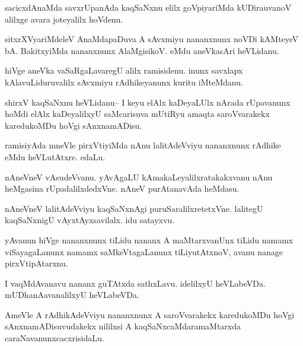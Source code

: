 \documentclass{article}
\begin{document}
\begin{mn}%
sacicxdAnaMda savxrUpanAda kaqSaNxnu elilx goVpiyariMda kUDirauvanoV alilxge avara 
joteyalilx hoVdenu.
\end{mn}

\begin{mn}%
sitxrXVyariMdeleV AnaMdapaDuva A sAvxmiyu nananxnunx noVDi kAMteyeV bA. BakitxyiMda 
nananxnunx AlaMgisikoV. eMdu aneVkasAri heVLidanu.
\end{mn}

\begin{mn}%
hiVge aneVka vaSaRgaLavaregU alilx ramisidenu. inunx savxlapx kAlavuLiduruvalilx sAvxmiyu 
rAdhikeyanunx kuritu iMteMdanu.
\end{mn}

\begin{mn}%
shirxV kaqSaNxnu heVLidanu-- I keyu elAlx kaDeyaLUlx nArada rUpavanunx hoMdi elAlx 
kaDeyalilxyU saMcarisuva mUtiRyu amaqta saroVvarakekx karedukoMDu hoVgi sAnxnamADisu.
\end{mn}

\begin{mn}%
ramisiyAda mneVle pirxVtiyiMda nAnu lalitAdeVviyu nananxnunx rAdhike eMdu heVLutAtxre. edaLu.
\end{mn}

\begin{mn}%
nAneVneV vAsudeVvanu. yAvAgaLU kAmakaLeyalilxratakakxvanu nAnu heMgasina 
rUpadalilxdedxVne. nAneV purAtanavAda heMdasu.
\end{mn}

\begin{mn}%
nAneVneV lalitAdeVviyu kaqSaNxnAgi puruSaralilxretetxVne. lalitegU kaqSaNxnigU 
vAyxtAyxsavilalx. idu satayxvu.
\end{mn}

\begin{mn}%
yAvanun hiVge nananxnunx tiLidu nananx A maMtarxvanUnx tiLidu namamx viSayagaLanunx namamx 
saMkeVtagaLanunx tiLiyutAtxnoV, avanu nanage pirxVtipAtarxnu.
\end{mn}

\begin{mn}%
I vaqMdAvanavu nananx guTAtxda sathxLavu. idelilxyU heVLabeVDa. mUDhanAavanalilxyU 
heVLabeVDa.
\end{mn}

\begin{mn}%
AmeVle A rAdhikAdeVviyu nananxnunx A saroVvarakekx karedukoMDu hoVgi sAnxnamADisuvudakekx 
nililxsi A kaqSaNxcaMdaramaMtarxda caraNavanunxcacxrisidaLu.
\end{mn}
\end{document}
